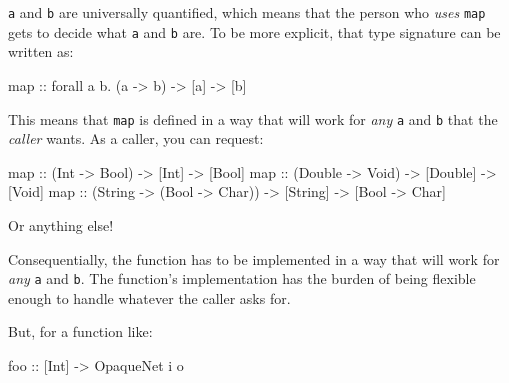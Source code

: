 \documentclass[]{article}
\newenvironment{Shaded}{\begin{snugshade}}{\end{snugshade}}
\newcommand{\DataTypeTok}[1]{\textcolor[rgb]{0.13,0.29,0.53}{#1}}
\newcommand{\FunctionTok}[1]{\textcolor[rgb]{0.00,0.00,0.00}{#1}}
\newcommand{\NormalTok}[1]{#1}
\newcommand{\OtherTok}[1]{\textcolor[rgb]{0.56,0.35,0.01}{#1}}
\begin{document}
\texttt{a} and \texttt{b} are universally quantified, which means that the
person who \emph{uses} \texttt{map} gets to decide what \texttt{a} and
\texttt{b} are. To be more explicit, that type signature can be written as:

\begin{Shaded}
\begin{Highlighting}[]
\NormalTok{map}\OtherTok{ ::}\NormalTok{ forall a b}\FunctionTok{.}\NormalTok{ (a }\OtherTok{->}\NormalTok{ b) }\OtherTok{->}\NormalTok{ [a] }\OtherTok{->}\NormalTok{ [b]}
\end{Highlighting}
\end{Shaded}

This means that \texttt{map} is defined in a way that will work for \emph{any}
\texttt{a} and \texttt{b} that the \emph{caller} wants. As a caller, you can
request:

\begin{Shaded}
\begin{Highlighting}[]
\NormalTok{map}\OtherTok{ ::}\NormalTok{ (}\DataTypeTok{Int} \OtherTok{->} \DataTypeTok{Bool}\NormalTok{)    }\OtherTok{->}\NormalTok{ [}\DataTypeTok{Int}\NormalTok{]    }\OtherTok{->}\NormalTok{ [}\DataTypeTok{Bool}\NormalTok{]}
\NormalTok{map}\OtherTok{ ::}\NormalTok{ (}\DataTypeTok{Double} \OtherTok{->} \DataTypeTok{Void}\NormalTok{) }\OtherTok{->}\NormalTok{ [}\DataTypeTok{Double}\NormalTok{] }\OtherTok{->}\NormalTok{ [}\DataTypeTok{Void}\NormalTok{]}
\NormalTok{map}\OtherTok{ ::}\NormalTok{ (}\DataTypeTok{String} \OtherTok{->}\NormalTok{ (}\DataTypeTok{Bool} \OtherTok{->} \DataTypeTok{Char}\NormalTok{)) }\OtherTok{->}\NormalTok{ [}\DataTypeTok{String}\NormalTok{] }\OtherTok{->}\NormalTok{ [}\DataTypeTok{Bool} \OtherTok{->} \DataTypeTok{Char}\NormalTok{]}
\end{Highlighting}
\end{Shaded}

Or anything else!

Consequentially, the function has to be implemented in a way that will work for
\emph{any} \texttt{a} and \texttt{b}. The function's implementation has the
burden of being flexible enough to handle whatever the caller asks for.

But, for a function like:

\begin{Shaded}
\begin{Highlighting}[]
\OtherTok{foo ::}\NormalTok{ [}\DataTypeTok{Int}\NormalTok{] }\OtherTok{->} \DataTypeTok{OpaqueNet}\NormalTok{ i o}
\end{Highlighting}
\end{Shaded}
\end{document}

